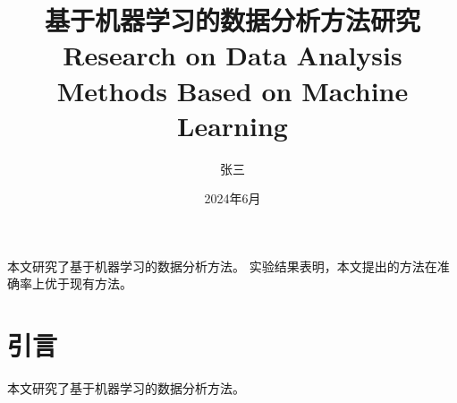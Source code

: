 \documentclass[type=bachelor, blind=true]{sduthesis}
\title{基于机器学习的数据分析方法研究}
\title*{Research on Data Analysis Methods Based on Machine Learning}
\author{张三}
\date{2024年6月}
\begin{document}
\makecover

\begin{cnabstract}
  本文研究了基于机器学习的数据分析方法。
  实验结果表明，本文提出的方法在准确率上优于现有方法。
\end{cnabstract}

\tableofcontents

\chapter{引言}
本文研究了基于机器学习的数据分析方法。


\printbibliography

\makedeclaration
\end{document}
